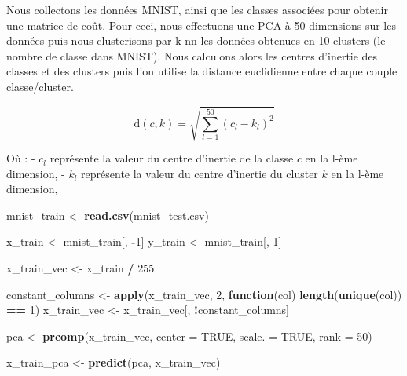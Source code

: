 \documentclass[
]{article}
\newenvironment{Shaded}{\begin{snugshade}}{\end{snugshade}}
\newcommand{\AttributeTok}[1]{\textcolor[rgb]{0.13,0.29,0.53}{#1}}
\newcommand{\ConstantTok}[1]{\textcolor[rgb]{0.56,0.35,0.01}{#1}}
\newcommand{\ControlFlowTok}[1]{\textcolor[rgb]{0.13,0.29,0.53}{\textbf{#1}}}
\newcommand{\DecValTok}[1]{\textcolor[rgb]{0.00,0.00,0.81}{#1}}
\newcommand{\FunctionTok}[1]{\textcolor[rgb]{0.13,0.29,0.53}{\textbf{#1}}}
\newcommand{\NormalTok}[1]{#1}
\newcommand{\OtherTok}[1]{\textcolor[rgb]{0.56,0.35,0.01}{#1}}
\newcommand{\SpecialCharTok}[1]{\textcolor[rgb]{0.81,0.36,0.00}{\textbf{#1}}}
\newcommand{\StringTok}[1]{\textcolor[rgb]{0.31,0.60,0.02}{#1}}
\begin{document}
Nous collectons les données MNIST, ainsi que les classes associées pour
obtenir une matrice de coût. Pour ceci, nous effectuons une PCA à 50
dimensions sur les données puis nous clusterisons par k-nn les données
obtenues en 10 clusters (le nombre de classe dans MNIST). Nous calculons
alors les centres d'inertie des classes et des clusters puis l'on
utilise la distance euclidienne entre chaque couple classe/cluster.

\[
\text{d}(c, k) = \sqrt{\sum_{l=1}^{50} (c_{l} - k_{l})^2}
\]

Où : - \(c_l\) représente la valeur du centre d'inertie de la classe
\(c\) en la l-ème dimension, - \(k_l\) représente la valeur du centre
d'inertie du cluster \(k\) en la l-ème dimension,

\begin{Shaded}
\begin{Highlighting}[]
\NormalTok{mnist\_train }\OtherTok{\textless{}{-}}  \FunctionTok{read.csv}\NormalTok{(}\StringTok{\textquotesingle{}mnist\_test.csv\textquotesingle{}}\NormalTok{)}

\NormalTok{x\_train }\OtherTok{\textless{}{-}}\NormalTok{ mnist\_train[, }\SpecialCharTok{{-}}\DecValTok{1}\NormalTok{]}
\NormalTok{y\_train }\OtherTok{\textless{}{-}}\NormalTok{ mnist\_train[, }\DecValTok{1}\NormalTok{]}

\NormalTok{x\_train\_vec }\OtherTok{\textless{}{-}}\NormalTok{ x\_train }\SpecialCharTok{/} \DecValTok{255}

\NormalTok{constant\_columns }\OtherTok{\textless{}{-}} \FunctionTok{apply}\NormalTok{(x\_train\_vec, }\DecValTok{2}\NormalTok{, }\ControlFlowTok{function}\NormalTok{(col) }\FunctionTok{length}\NormalTok{(}\FunctionTok{unique}\NormalTok{(col)) }\SpecialCharTok{==} \DecValTok{1}\NormalTok{)}
\NormalTok{x\_train\_vec }\OtherTok{\textless{}{-}}\NormalTok{ x\_train\_vec[, }\SpecialCharTok{!}\NormalTok{constant\_columns]}

\NormalTok{pca }\OtherTok{\textless{}{-}} \FunctionTok{prcomp}\NormalTok{(x\_train\_vec, }\AttributeTok{center =} \ConstantTok{TRUE}\NormalTok{, }\AttributeTok{scale. =} \ConstantTok{TRUE}\NormalTok{, }\AttributeTok{rank =} \DecValTok{50}\NormalTok{)}

\NormalTok{x\_train\_pca }\OtherTok{\textless{}{-}} \FunctionTok{predict}\NormalTok{(pca, x\_train\_vec)}
\end{Highlighting}
\end{Shaded}

\hypertarget{section}{%
\subsection{}\label{section}}
\end{document}
